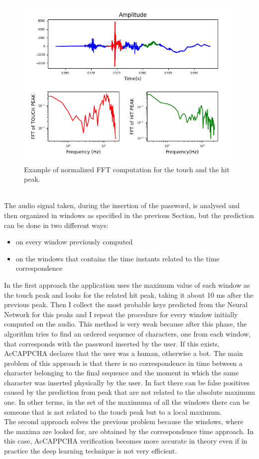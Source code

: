 \begin{figure}[h]
     \centering
     \includegraphics[width=.9\linewidth]{Images/Design/feature_example}
     \caption{\footnotesize{Example of normalized FFT computation for the touch and the hit peak.}}\label{design:feature_example}
\end{figure}\\
The audio signal taken, during the insertion of the password, is analysed and then organized in windows as specified in the previous Section, but the prediction can be done in two different ways:
\begin{itemize}
\item{on every window previously computed}
\item{on the windows that contains the time instants related to the time correspondence}
\end{itemize}
In the first approach the application uses the maximum value of each window as the touch peak and looks for the related hit peak, taking it about 10 ms after the previous peak. Then I collect the most probable keys predicted from the Neural Network for this peaks and I repeat the procedure for every window initially computed on the audio. This method is very weak because after this phase, the algorithm tries to find an ordered sequence of characters, one from each window, that corresponds with the password inserted by the user. If this exists, AcCAPPCHA declares that the user was a human, otherwise a bot. The main problem of this approach is that there is no correspondence in time between a character belonging to the final sequence and the moment in which the same character was inserted physically by the user. In fact there can be false positives caused by the prediction from peak that are not related to the absolute maximum one. In other terms, in the set of the maximuma of all the windows there can be someone that is not related to the touch peak but to a local maximum.\\
The second approach solves the previous problem because the windows, where the maxima are looked for, are obtained by the correspondence time approach. In this case, AcCAPPCHA verification becomes more accurate in theory even if in practice the deep learning technique is not very efficient.